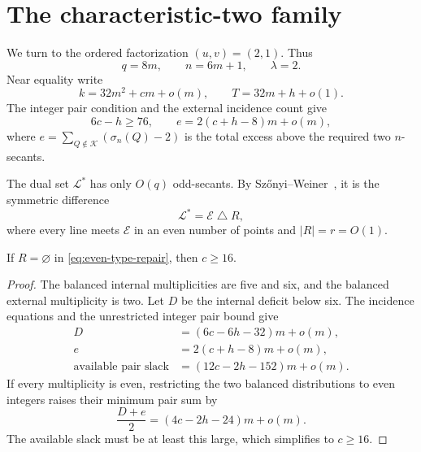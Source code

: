 \section{The characteristic-two family}\label{sec:characteristic-two}

We turn to the ordered factorization \((u,v)=(2,1)\).  Thus
\[
 q=8m,\qquad n=6m+1,\qquad \lambda=2.
\]
Near equality write
\begin{equation}\label{eq:characteristic-two-asymptotic}
 k=32m^2+cm+o(m),\qquad T=32m+h+o(1).
\end{equation}
The integer pair condition and the external incidence count give
\begin{equation}\label{eq:characteristic-two-linear}
 6c-h\ge76,\qquad
 e=2(c+h-8)m+o(m),
\end{equation}
where \(e=\sum_{Q\notin\mathcal K}(\sigma_n(Q)-2)\) is the total excess
above the required two \(n\)-secants.

The dual set \(\mathcal L^*\) has only \(O(q)\) odd-secants.  By
Sz\H{o}nyi--Weiner~\cite[Theorem~1.1]{SWeven}, it is the symmetric difference
\begin{equation}\label{eq:even-type-repair}
 \mathcal L^*=\mathcal E\mathbin{\triangle}R,
\end{equation}
where every line meets \(\mathcal E\) in an even number of points and
\(|R|=r=O(1)\).

\begin{lemma}\label{lem:even-type-case}
If \(R=\varnothing\) in \eqref{eq:even-type-repair}, then \(c\ge16\).
\end{lemma}

\begin{proof}
The balanced internal multiplicities are five and six, and the balanced
external multiplicity is two.  Let \(D\) be the internal deficit below six.
The incidence equations and the unrestricted integer pair bound give
\begin{align*}
 D&=(6c-6h-32)m+o(m),\\
 e&=2(c+h-8)m+o(m),\\
 \text{available pair slack}&=(12c-2h-152)m+o(m).
\end{align*}
If every multiplicity is even, restricting the two balanced distributions to
even integers raises their minimum pair sum by
\[
 \frac{D+e}{2}=(4c-2h-24)m+o(m).
\]
The available slack must be at least this large, which simplifies to
\(c\ge16\).
\end{proof}

